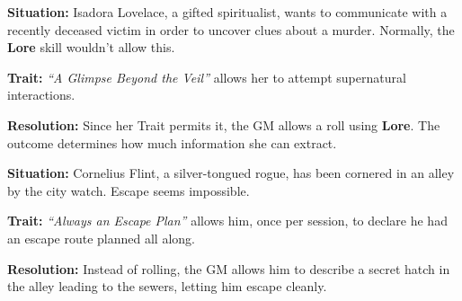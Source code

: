 \begin{Example}
	\textbf{Situation:} Isadora Lovelace, a gifted spiritualist, wants to communicate with a recently deceased victim in order to uncover clues about a murder. Normally, the \textbf{Lore} skill wouldn’t allow this.

	\noindent\textbf{Trait:} \emph{“A Glimpse Beyond the Veil”} allows her to attempt supernatural interactions.

	\noindent\textbf{Resolution:} Since her Trait permits it, the GM allows a roll using \textbf{Lore}. The outcome determines how much information she can extract.
\end{Example}

\begin{Example}
	\textbf{Situation:} Cornelius Flint, a silver-tongued rogue, has been cornered in an alley by the city watch. Escape seems impossible.

	\noindent\textbf{Trait:} \emph{“Always an Escape Plan”} allows him, once per session, to declare he had an escape route planned all along.

	\noindent\textbf{Resolution:} Instead of rolling, the GM allows him to describe a secret hatch in the alley leading to the sewers, letting him escape cleanly.
\end{Example}
 
\BeginBoxPage
{}

